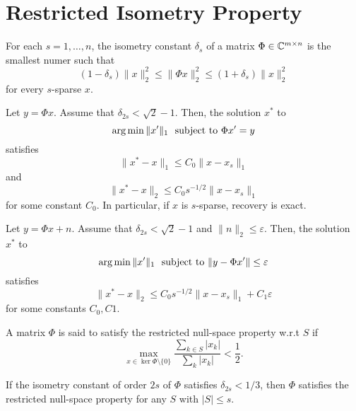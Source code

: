 \section{Restricted Isometry Property}

\begin{boxdefinition}
    For each $s=1,\dots,n$, the isometry constant $\delta_s$
    of a matrix $\Phi\in\mathbb{C}^{m\times n}$ is the smallest 
    numer such that 
    $$
    (1-\delta_s)\|x\|_2^2\leq\|\Phi x\|_2^2
    \leq(1+\delta_s)\|x\|_2^2
    $$
    for every $s$-sparse $x$.
\end{boxdefinition}

\begin{boxtheorem}
    Let $y=\Phi x$. Assume that $\delta_{2s}<\sqrt{2}-1$.
    Then, the solution $x^*$ to
    $$
    \operatorname*{arg\,min}\|x'\|_1 \ \ \text{subject to } \Phi x'=y
    $$
    satisfies
    $$
    \|x^*-x\|_1\leq C_0\|x-x_s\|_1
    $$
    and
    $$
    \|x^*-x\|_2\leq C_0s^{-1/2}\|x-x_s\|_1
    $$
    for some constant $C_0$. In particular, if $x$ is
    $s$-sparse, recovery is exact.
\end{boxtheorem}

\begin{boxtheorem}
    Let $y=\Phi x+n$. Assume that $\delta_{2s}<\sqrt{2}-1$
    and $\|n\|_2\leq\varepsilon$.
    Then, the solution $x^*$ to
    $$
    \operatorname*{arg\,min}\|x'\|_1 \ \ \text{subject to } 
    \|y-\Phi x'\|\leq\varepsilon
    $$
    satisfies
    $$
    \|x^*-x\|_2\leq C_0s^{-1/2}\|x-x_s\|_1+C_1\varepsilon
    $$
    for some constants $C_0,C1$.
\end{boxtheorem}

\begin{boxdefinition}
    A matrix $\Phi$ is said to satisfy the restricted
    null-space property w.r.t $S$ if 
    $$
    \max_{x\in\ker \Phi\setminus\{0\}}
    \frac{\sum_{k\in S}|x_k|}{\sum_k|x_k|}<\frac{1}{2}.
    $$
\end{boxdefinition}

\begin{boxtheorem}
    If the isometry constant of order $2s$ of $\Phi$
    satisfies $\delta_{2s}<1/3$, then $\Phi$
    satisfies the restricted null-space property
    for any $S$ with $|S|\leq s$.
\end{boxtheorem}